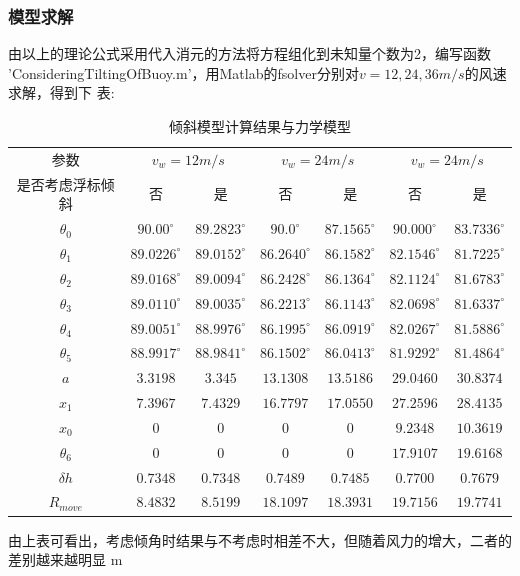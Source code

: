 \documentclass[a4paper,12pt]{ctexart}
\begin{document}
\subsubsection{模型求解}
由以上的理论公式采用代入消元的方法将方程组化到未知量个数为2，编写函数 'ConsideringTiltingOfBuoy.m'，用Matlab的fsolver分别对$v=12,24,36m/s$的风速求解，得到下
表:
\begin{table}[!ht]
\centering
\caption{倾斜模型计算结果与力学模型}
\begin{tabular}{c cc cc cc}
\hline \hline
\multicolumn{1}{c}{参数} & \multicolumn{2}{c}{$v_w=12m/s$} & \multicolumn{2}{c}{$v_w=24m/s$} & \multicolumn{2}{c}{$v_w=24m/s$}\\
\multicolumn{1}{c}{是否考虑浮标倾斜} & 否 & 是& 否& 是& 否& 是\\
\hline
$\theta_0$ & $90.00^{\circ}$ & $89.2823^{\circ}$ & $90.0^{\circ}$ & $87.1565^{\circ}$					& $90.000^{\circ}$ & $83.7336^{\circ}$\\
$\theta_1$ & $89.0226^{\circ}$ & $89.0152^{\circ}$ & $86.2640^{\circ}$ & $86.1582^{\circ}$					& $82.1546^{\circ}$ & $81.7225^{\circ}$\\
$\theta_2$ & $89.0168^{\circ}$ & $89.0094^{\circ}$ & $86.2428^{\circ}$ & $86.1364^{\circ}$               & $82.1124^{\circ}$ & $81.6783^{\circ}$\\
$\theta_3$ & $89.0110^{\circ}$ & $89.0035^{\circ}$ & $86.2213^{\circ}$ & $86.1143^{\circ}$             & $82.0698^{\circ}$ & $81.6337^{\circ}$\\
$\theta_4$ & $89.0051^{\circ}$ & $88.9976^{\circ}$ & $86.1995^{\circ}$ & $86.0919^{\circ}$           & $82.0267^{\circ}$ & $81.5886^{\circ}$\\
$\theta_5$ & $88.9917^{\circ}$ & $88.9841^{\circ}$ & $86.1502^{\circ}$ & $86.0413^{\circ}$               & $81.9292^{\circ}$ & $81.4864^{\circ}$\\
$a$        & $3.3198$          & $3.345$           & $13.1308$  		 &	$13.5186$					 & $29.0460$ 	  & $30.8374$  \\
$x_1$      & $7.3967$          & $7.4329$          & $16.7797$ 		    & $17.0550$    & $27.2596$         & $28.4135$   \\                               
$x_0$      & $0$               & $0$               & $0$ 					 & $0$   & $9.2348 $ 	  & $10.3619$  \\
$\theta_6$ & $0$               & $0$               & $0$                & $0$   & $17.9107$         & $19.6168$ \\
$\delta h$ & $0.7348$          & $0.7348$          & $0.7489$           & $0.7485$ & $0.7700 $         & $0.7679 $  \\
$R_{move}$ & $8.4832$          & $8.5199$          & $18.1097$          & $18.3931$  & $19.7156$         & $19.7741$\\

\hline \hline
\end{tabular}
\end{table}
由上表可看出，考虑倾角时结果与不考虑时相差不大，但随着风力的增大，二者的差别越来越明显
m
\end{document}
